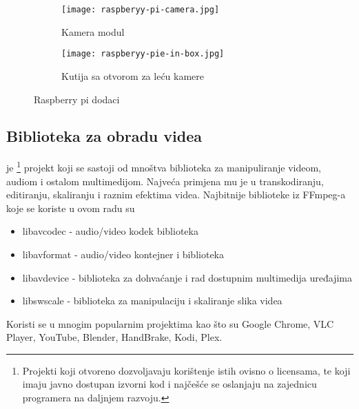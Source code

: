 \begin{figure}[ht]
  \centering
  \begin{subfigure}{.5\textwidth}
    \centering
    \texttt{[image: raspberyy-pi-camera.jpg]}
    \caption{Kamera modul}
  \end{subfigure}%
  \begin{subfigure}{.5\textwidth}
    \centering
    \texttt{[image: raspberyy-pie-in-box.jpg]}
    \caption{Kutija sa otvorom za leću kamere}
  \end{subfigure}%
  \caption{Raspberry pi dodaci}
\end{figure}

\clearpage
\subsection{Biblioteka za obradu videa} \label{sec:ffmpeg}
   je 
  \footnote
  {
    Projekti koji otvoreno dozvoljavaju korištenje istih ovisno o licensama, te koji imaju javno dostupan izvorni kod
    i najčešće se oslanjaju na zajednicu programera na daljnjem razvoju.
  }
  {} 
  projekt koji se sastoji od mnoštva biblioteka za manipuliranje videom, audiom i ostalom multimedijom.
  \cite{ffmpegBook}
\paraBreak
Najveća primjena mu je u transkodiranju, editiranju, skaliranju i raznim efektima videa.
\paraBreak
Najbitnije biblioteke iz FFmpeg-a koje se koriste u ovom radu su \cite{ffmpegDocs}
\begin{itemize}
  \item libavcodec - audio/video kodek biblioteka
  \item libavformat - audio/video kontejner \hyperref[sct:mux]{} i \hyperref[sct:demux]{} biblioteka
  \item libavdevice - biblioteka za dohvaćanje i rad dostupnim multimedija uređajima
  \item libswscale - biblioteka za manipulaciju i skaliranje slika videa
\end{itemize}
Koristi se u mnogim popularnim projektima kao što su Google Chrome, VLC Player, YouTube, Blender, HandBrake, Kodi, Plex. \cite{ffmpegBook}
